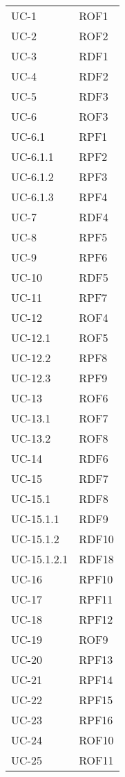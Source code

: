 \begin{longtable}{| p{5cm} | p{5cm} |}
		UC-1 & ROF1  \\
		\rowcolor{LightGray}
		UC-2 & ROF2 \\
		UC-3 & RDF1 \\
		\rowcolor{LightGray}
		UC-4 & RDF2 \\
		UC-5 & RDF3 \\
		\rowcolor{LightGray}
		UC-6 & ROF3 \\
		UC-6.1 & RPF1 \\
		\rowcolor{LightGray}
		UC-6.1.1 & RPF2 \\
		UC-6.1.2 & RPF3 \\
		\rowcolor{LightGray}
		UC-6.1.3 & RPF4 \\
		UC-7 & RDF4 \\
		\rowcolor{LightGray}
		UC-8 & RPF5 \\
		UC-9 & RPF6 \\
		\rowcolor{LightGray}
		UC-10 & RDF5 \\
		UC-11 & RPF7 \\
		\rowcolor{LightGray}
		UC-12 & ROF4 \\
		UC-12.1 & ROF5 \\
		\rowcolor{LightGray}
		UC-12.2 & RPF8 \\
		UC-12.3 & RPF9 \\
		\rowcolor{LightGray}
		UC-13 & ROF6 \\
		UC-13.1 & ROF7 \\
		\rowcolor{LightGray}
		UC-13.2 & ROF8 \\
		UC-14 & RDF6\\
		\rowcolor{LightGray}
		UC-15 & RDF7 \\
		UC-15.1 & RDF8\\
		\rowcolor{LightGray}
		UC-15.1.1 & RDF9\\
		UC-15.1.2 & RDF10\\
		\rowcolor{LightGray}
		UC-15.1.2.1 & RDF18\\
		UC-16 & RPF10\\
		UC-17 & RPF11\\
		\rowcolor{LightGray}
		UC-18 & RPF12 \\
		UC-19 & ROF9 \\
		\rowcolor{LightGray}
		UC-20 & RPF13 \\
		UC-21 & RPF14 \\
		\rowcolor{LightGray}
		UC-22 & RPF15 \\ 
		UC-23 & RPF16\\
		\rowcolor{LightGray}
		UC-24 & ROF10 \\
		UC-25 & ROF11 \\

\end{longtable}
